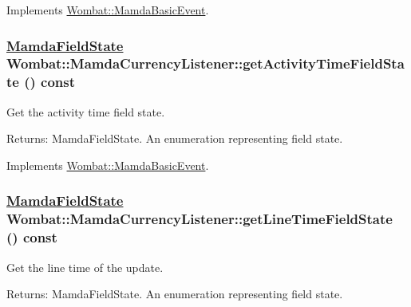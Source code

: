 Implements \hyperlink{classWombat_1_1MamdaBasicEvent_9cd58f3d7b5ebea42fa86e5dde46ab18}{Wombat::Mamda\-Basic\-Event}.\hypertarget{classWombat_1_1MamdaCurrencyListener_7ad1cdb959dcb619780b27383704d157}{
\subsubsection[getActivityTimeFieldState]{\setlength{\rightskip}{0pt plus 5cm}\hyperlink{namespaceWombat_93aac974f2ab713554fd12a1fa3b7d2a}{Mamda\-Field\-State} Wombat::Mamda\-Currency\-Listener::get\-Activity\-Time\-Field\-State () const}}
\label{classWombat_1_1MamdaCurrencyListener_7ad1cdb959dcb619780b27383704d157}


Get the activity time field state. 

\begin{Desc}
\item[Returns:]Mamda\-Field\-State. An enumeration representing field state. \end{Desc}


Implements \hyperlink{classWombat_1_1MamdaBasicEvent_a61a566e3442181ca1fadc4524296cd0}{Wombat::Mamda\-Basic\-Event}.\hypertarget{classWombat_1_1MamdaCurrencyListener_a1c7db47ff4db093c4d13fddc44fd7e6}{
\subsubsection[getLineTimeFieldState]{\setlength{\rightskip}{0pt plus 5cm}\hyperlink{namespaceWombat_93aac974f2ab713554fd12a1fa3b7d2a}{Mamda\-Field\-State} Wombat::Mamda\-Currency\-Listener::get\-Line\-Time\-Field\-State () const}}
\label{classWombat_1_1MamdaCurrencyListener_a1c7db47ff4db093c4d13fddc44fd7e6}


Get the line time of the update. 

\begin{Desc}
\item[Returns:]Mamda\-Field\-State. An enumeration representing field state. \end{Desc}


